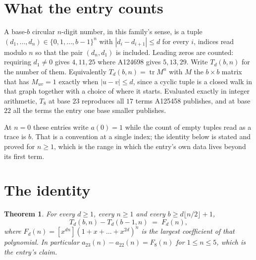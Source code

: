 \documentclass[11pt,a4paper]{article}
\theoremstyle{plain}
\newtheorem{theorem}{Theorem}
\theoremstyle{definition}
\begin{document}
\section{What the entry counts}

A base-$b$ circular $n$-digit number, in this family's sense, is a tuple
$(d_1,\dots,d_n)\in\{0,1,\dots,b-1\}^{n}$ with $|d_i-d_{i+1}|\le d$ for every $i$, indices
read modulo $n$ so that the pair $(d_n,d_1)$ is included. Leading zeros are counted: requiring
$d_1\ne0$ gives $4,11,25$ where A124698 gives $5,13,29$. Write $T_d(b,n)$ for the number of
them. Equivalently $T_d(b,n)=\operatorname{tr}M^{n}$ with $M$ the $b\times b$ matrix that has
$M_{uv}=1$ exactly when $|u-v|\le d$, since a cyclic tuple is a closed walk in that graph
together with a choice of where it starts. Evaluated exactly in integer arithmetic, $T_{8}$
at base $23$ reproduces all $17$ terms A125458 publishes, and at base $22$ all the
terms the entry one base smaller publishes.

At $n=0$ these entries write $a(0)=1$ while the count of empty tuples read as a trace is $b$.
That is a convention at a single index; the identity below is stated and proved for $n\ge1$,
which is the range in which the entry's own data lives beyond its first term.

\section{The identity}

\begin{theorem}
For every $d\ge1$, every $n\ge1$ and every $b\ge d\lfloor n/2\rfloor+1$,
\[
T_d(b,n)-T_d(b-1,n)\;=\;F_d(n),
\]
where $F_d(n)=[x^{dn}](1+x+\dots+x^{2d})^{n}$ is the largest coefficient of that
polynomial. In particular $a_{23}(n)-a_{22}(n)=F_{8}(n)$ for $1\le n\le5$, which
is the entry's claim.
\end{theorem}
\end{document}
